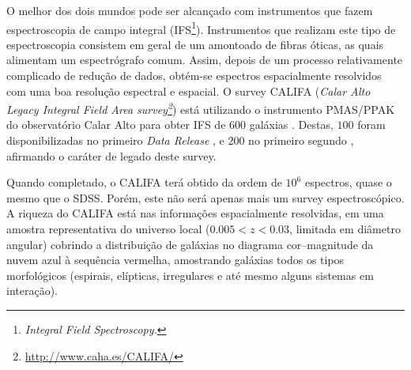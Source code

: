 O melhor dos dois mundos pode ser alcançado com instrumentos que fazem
espectroscopia de campo integral (IFS\footnote{\em Integral Field
Spectroscopy.}). Instrumentos que realizam este tipo de espectroscopia consistem
em geral de um amontoado de fibras óticas, as quais alimentam um espectrógrafo
comum. Assim, depois de um processo relativamente complicado de redução de
dados, obtém-se espectros espacialmente resolvidos com uma boa resolução
espectral e espacial. O survey CALIFA ({\em Calar Alto Legacy Integral Field
Area survey\footnote{\url{http://www.caha.es/CALIFA/}}}) está utilizando o
instrumento PMAS/PPAK do observatório Calar Alto para obter IFS de $600$
galáxias \citep{Sanchez2012}. Destas, $100$ foram disponibilizadas no
primeiro {\em Data Release} \citep[DR1]{Husemann2013}, e $200$ no primeiro
segundo \citep{GarciaBenito2015}, afirmando o caráter de legado
deste survey.

Quando completado, o CALIFA terá obtido da ordem de $10^6$ espectros, quase o
mesmo que o SDSS. Porém, este não será apenas mais um survey espectroscópico. A
riqueza do CALIFA está nas informações espacialmente resolvidas, em uma amostra
representativa do universo local ($0.005 < z < 0.03$, limitada em diâmetro
angular) cobrindo a distribuição de galáxias no diagrama cor--magnitude da nuvem
azul à sequência vermelha, amostrando galáxias todos os tipos morfológicos
(espirais, elípticas, irregulares e até mesmo alguns sistemas em interação).


